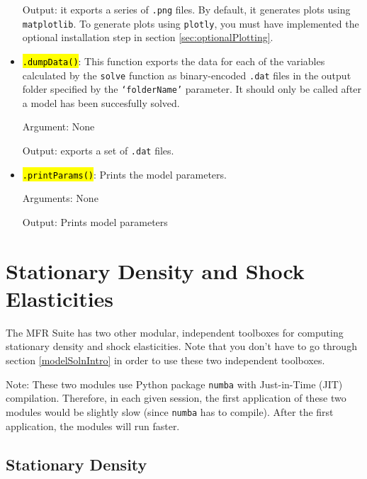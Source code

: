 \documentclass[12pt]{article}
\newcommand{\softwareShortName}{MFR Suite\xspace}
\DeclareRobustCommand{\hlCODE}[1]{{\sethlcolor{backcolour}\hl{#1}}}
\begin{document}
\begin{itemize}
       
       Output: it exports a series of \texttt{.png} files. By default, it generates plots using \texttt{matplotlib}. To generate plots using \texttt{plotly}, you must have implemented the optional installation step in section \ref{sec:optionalPlotting}.
       
        \item \hlCODE{\texttt{.dumpData()}}: This function exports the data for each of the
        variables calculated by the \texttt{solve} function as binary-encoded
        \texttt{.dat} files in the output folder specified by the
        \texttt{`folderName'} parameter. It should only be called after a model
        has been succesfully solved. 
       
       Argument: None

       Output: exports a set of \texttt{.dat} files.
       
        \item \hlCODE{\texttt{.printParams()}}: Prints the model parameters.

       Arguments: None
       
       Output: Prints model parameters

\end{itemize}

\newpage
\section{Stationary Density and Shock Elasticities}\label{sec:otherTools}
The \softwareShortName has two other modular, independent toolboxes for computing stationary density and shock elasticities. Note that you don't have to go through section \ref{modelSolnIntro} in order to use these two independent toolboxes.

\begin{tcolorbox}
Note: These two modules use Python package \texttt{numba} with Just-in-Time (JIT) compilation. Therefore, in each given session, the first application of these two modules would be slightly slow (since \texttt{numba} has to compile). After the first application, the modules will run faster.
\end{tcolorbox}

\subsection{Stationary Density}\label{statDentIntro}
\end{document}
